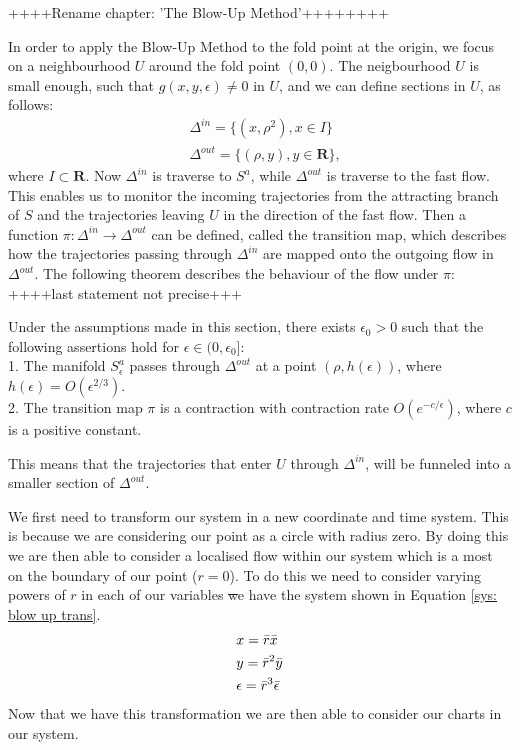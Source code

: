 ++++Rename chapter: 'The Blow-Up Method'++++++++

In order to apply the Blow-Up Method to the fold point at the origin, we focus on a neighbourhood $U$ around the fold point $(0,0)$. 
The neigbourhood $U$ is small enough, such that $g(x,y, \epsilon) \neq 0$ in $U$, and we can define sections in $U$, as follows:
\begin{align*}
&\Delta ^{in} = \{ (x, \rho^2), x \in I \} \\
&\Delta ^{out} = \{ (\rho, y), y \in \mathbf{R} \},
\end{align*}
where $I \subset \mathbf{R}$. Now $\Delta^{in}$ is traverse to $S^a$, while $\Delta^{out}$ is traverse to the fast flow. This enables us to monitor the incoming trajectories from the attracting branch of $S$ and the trajectories leaving $U$ in the direction of the fast flow.
Then a function $\pi : \Delta^{in} \to \Delta^{out}$ can be defined, called the transition map, which describes how the trajectories passing through $\Delta^{in}$ are mapped onto the outgoing flow in $\Delta^{out}$.  
The following theorem describes the behaviour of the flow under $\pi$: ++++last statement not precise+++
\begin{theorem}%
Under the assumptions made in this section, there exists $ \epsilon_0 >0$ such that the following assertions hold for $\epsilon \in (0, \epsilon_0]$:\\
1. The manifold $S_\epsilon^a$ passes through $\Delta^{out}$ at a point $(\rho, h(\epsilon))$, where $h(\epsilon) = O(\epsilon^{2/3})$.\\
2. The transition map $\pi$ is a contraction with contraction rate $O(e^{-c/\epsilon})$, where $c$ is a positive constant.
\end{theorem}
This means that the trajectories that enter $U$ through $\Delta^{in}$, will be funneled into a smaller section of $\Delta^{out}$. 





We first need to transform our system in a new coordinate and time system. This is because we are considering our point as a circle with radius zero. By doing this we are then able to consider a localised flow within our system which is a most on the boundary of our point ($r=0$). To do this we need to consider varying powers of $r$ in each of our variables \st we have the system shown in Equation \ref{sys: blow up trans}.  
\begin{subequations}
    \begin{align}
        &x=\Bar{r}\Bar{x}  \label{sys: blow up trans x}\\
        &y=\Bar{r}^2\Bar{y} \label{sys: blow up trans y}\\ 
        &\epsilon=\bar{r}^3\bar{\epsilon} \label{sys: blow up trans z}
    \end{align}  
    \label{sys: blow up trans}
\end{subequations}
Now that we have this transformation we are then able to consider our charts in our system.


